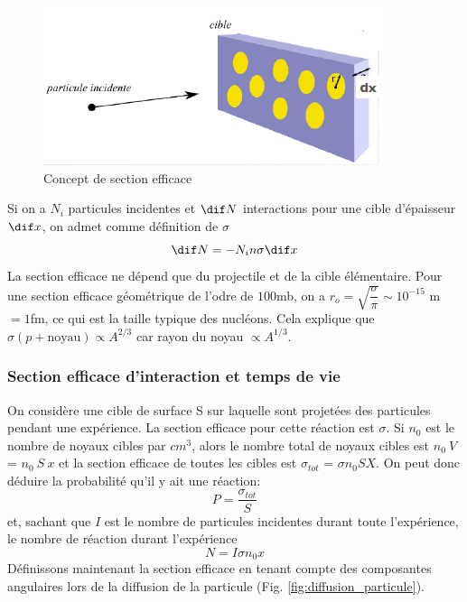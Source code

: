 \begin{figure}[ht]
    \centering
    \includegraphics[scale=0.75]{Images1/section_efficace.PNG}
    \caption{Concept de section efficace}
    \label{fig:section_efficace}
\end{figure}
Si on a $N_i$ particules incidentes et $\dif N$ interactions pour une cible d'épaisseur $\dif x$, on admet comme définition de $\sigma$
\[
    \dif N=-N_in\sigma \dif x
\]
La section efficace ne dépend que du projectile et de la cible élémentaire. Pour une section efficace géométrique de l'odre de $100$mb, on a $r_o=\sqrt{\dfrac{\sigma}{\pi}}\sim 10^{-15}$ m$=1$fm, ce qui est la taille typique des nucléons. Cela explique que $\sigma(p+\text{noyau})\propto A^{2/3}$ car rayon du noyau $\propto A^{1/3}$.

\subsubsection{Section efficace d'interaction et temps de vie}

On considère une cible de surface S sur laquelle sont projetées des particules pendant une expérience. La section efficace pour cette réaction est $\sigma$. Si $n_0$ est le nombre de noyaux cibles par $cm^3$, alors le nombre total de noyaux cibles est $n_0~V$ = $n_0~S~x$ et la section efficace de toutes les cibles est $\sigma_{tot}$ = $\sigma n_0 S X$. On peut donc déduire la probabilité qu'il y ait une réaction:
\[
    P=\dfrac{\sigma_{tot}}{S}
\]
et, sachant que $I$ est le nombre de particules incidentes durant toute l'expérience, le nombre de réaction durant l'expérience
\[
    N=I \sigma n_0 x
\]
Définissons maintenant la section efficace en tenant compte des composantes angulaires lors de la diffusion de la particule (Fig. \ref{fig:diffusion_particule}).

